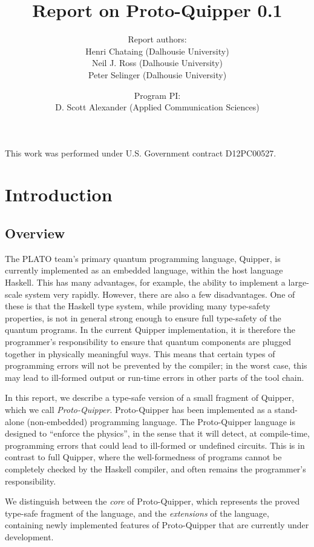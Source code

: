 \documentclass[twoside]{article}
\title{Report on Proto-Quipper 0.1}
\author{Report authors: \\
  Henri Chataing (Dalhousie University)\\
  Neil J. Ross (Dalhousie University)\\
  Peter Selinger (Dalhousie University)
}
\date{Program PI:\\
  D. Scott Alexander (Applied Communication Sciences)}
\begin{document}
\maketitle
\thispagestyle{fancy}

This work was performed under U.S. Government contract D12PC00527.

\tableofcontents

\clearpage
\section{Introduction}

\subsection{Overview}

The PLATO team's primary quantum programming language, Quipper, is
currently implemented as an embedded language, within the host
language Haskell. This has many advantages, for example, the ability
to implement a large-scale system very rapidly. However, there are
also a few disadvantages. One of these is that the Haskell type
system, while providing many type-safety properties, is not in general
strong enough to ensure full type-safety of the quantum programs. In
the current Quipper implementation, it is therefore the programmer's
responsibility to ensure that quantum components are plugged together
in physically meaningful ways. This means that certain types of
programming errors will not be prevented by the compiler; in the worst
case, this may lead to ill-formed output or run-time errors in other
parts of the tool chain.

In this report, we describe a type-safe version of a small fragment of
Quipper, which we call {\em Proto-Quipper}. Proto-Quipper has been
implemented as a stand-alone (non-embedded) programming language.  The
Proto-Quipper language is designed to ``enforce the physics'', in the
sense that it will detect, at compile-time, programming errors that
could lead to ill-formed or undefined circuits.  This is in contrast
to full Quipper, where the well-formedness of programs cannot be
completely checked by the Haskell compiler, and often remains the
programmer's responsibility.

We distinguish between the \emph{core} of Proto-Quipper, which 
represents the proved type-safe fragment of the language, and 
the \emph{extensions} of the language, containing newly 
implemented features of Proto-Quipper that are currently under 
development. 
\end{document}
